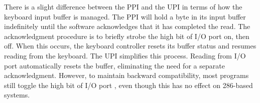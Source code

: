 \documentclass[book.tex]{subfiles}
\begin{document}
\par
There is a slight difference between the PPI and the UPI in terms of how the keyboard input buffer is managed. The PPI will hold a byte in its input buffer indefinitely until the software acknowledges that it has completed the read. The acknowledgment procedure is to briefly strobe the high bit of I/O port  on, then off. When this occurs, the keyboard controller resets its buffer status and resumes reading from the keyboard. The UPI simplifies this process. Reading from I/O port  automatically resets the buffer, eliminating the need for a separate acknowledgment. However, to maintain backward compatibility, most programs still toggle the high bit of I/O port , even though this has no effect on 286-based systems.\\

\par
\begin{minipage}{\textwidth}

\end{minipage}
\end{document}

